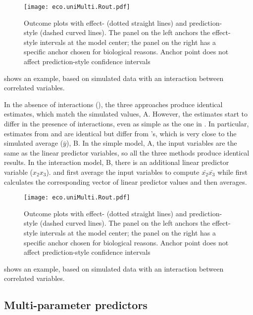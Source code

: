 \begin{figure}
\begin{center}
\texttt{[image: eco.uniMulti.Rout.pdf]}
\end{center}
\caption{Outcome plots with effect- (dotted straight lines) and prediction-style (dashed curved lines). The panel on the left anchors the effect-style intervals at the model center; the panel on the right has a specific anchor chosen for biological reasons. Anchor point does not affect prediction-style confidence intervals}
\end{figure}

 shows an example, based on simulated data with an interaction between correlated variables.

In the absence of interactions (), the three approaches produce identical estimates, which match the simulated values, A. However, the estimates start to differ in the presence of interactions, even as simple as the one in . In particular, estimates from  and  are identical but differ from 's, which is very close to the simulated average ($\bar{y}$), B.
In the simple model, A, the input variables are the same as the linear predictor variables, so all the three methods produce identical results.
In the interaction model, B, there is an additional linear predictor variable ($x_2x_3$).  and  first average the input variables to compute $\bar{x_2}\bar{x_3}$ while  first calculates the corresponding vector of linear predictor values and then averages.

\begin{figure}
\begin{center}
\texttt{[image: eco.uniMulti.Rout.pdf]}
\end{center}
\caption{Outcome plots with effect- (dotted straight lines) and prediction-style (dashed curved lines). The panel on the left anchors the effect-style intervals at the model center; the panel on the right has a specific anchor chosen for biological reasons. Anchor point does not affect prediction-style confidence intervals}
\end{figure}

 shows an example, based on simulated data with an interaction between correlated variables.

\subsection{Multi-parameter predictors}

